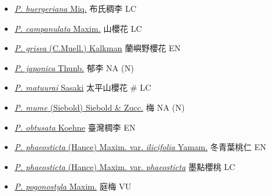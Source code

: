 \begin{itemize}
  \begin{itemize}
        \item[] \href{http://www.theplantlist.org/tpl1.1/search?q=Prunus+buergeriana}{\textit{P. buergeriana} Miq.}   布氏稠李   LC
        \item[] \href{http://www.theplantlist.org/tpl1.1/search?q=Prunus+campanulata}{\textit{P. campanulata} Maxim.}   山櫻花   LC
        \item[] \href{http://www.theplantlist.org/tpl1.1/search?q=Prunus+grisea}{\textit{P. grisea} (C.Muell.) Kalkman}   蘭嶼野櫻花   EN
        \item[] \href{http://www.theplantlist.org/tpl1.1/search?q=Prunus+japonica}{\textit{P. japonica} Thunb.}   郁李   NA (N)
        \item[] \href{http://www.theplantlist.org/tpl1.1/search?q=Prunus+matuurai}{\textit{P. matuurai} Sasaki}   太平山櫻花  \# LC
        \item[] \href{http://www.theplantlist.org/tpl1.1/search?q=Prunus+mume}{\textit{P. mume} (Siebold) Siebold \& Zucc.}   梅   NA (N)
        \item[] \href{http://www.theplantlist.org/tpl1.1/search?q=Prunus+obtusata}{\textit{P. obtusata} Koehne}   臺灣椆李   EN
        \item[] \href{http://www.theplantlist.org/tpl1.1/search?q=Prunus+phaeosticta+var.+ilicifolia}{\textit{P. phaeosticta} (Hance) Maxim. var. \textit{ilicifolia} Yamam.}   冬青葉桃仁   EN
        \item[] \href{http://www.theplantlist.org/tpl1.1/search?q=Prunus+phaeosticta+var.+phaeosticta}{\textit{P. phaeosticta} (Hance) Maxim. var. \textit{phaeosticta}}   墨點櫻桃   LC
        \item[] \href{http://www.theplantlist.org/tpl1.1/search?q=Prunus+pogonostyla}{\textit{P. pogonostyla} Maxim.}   庭梅   VU

\end{itemize}
\end{itemize}
